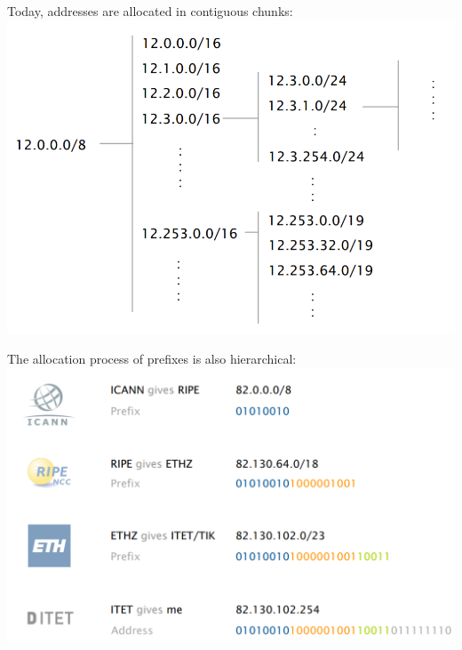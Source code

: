 \documentclass[a4paper, fontsize=8pt, landscape, DIV=1]{scrartcl}
\begin{document}
\begin{multicols*}{4}
   		Today, addresses are allocated in contiguous chunks:\\ 
   		\includegraphics[width=\columnwidth]{images/Network_Layer/IP_chunk.png}
   		\pagebreak
   		
   		The allocation process of prefixes is also hierarchical:\\
   		\includegraphics[width=\columnwidth]{images/Network_Layer/prefix_allocation.png}
   		

\end{multicols*}
\end{document}
